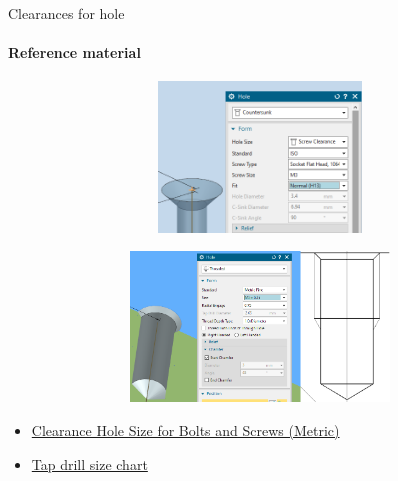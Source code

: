 \documentclass[aspectratio=169]{beamer}
\begin{document}
\begin{frame}[t]{Clearances for hole}
\framesubtitle{Reference material}
        \vspace{-0.4cm}
        \begin{figure}[H]
            \begin{subfigure}[t]{0.48\textwidth}
                \centering\includegraphics[height=4cm,width=1\textwidth,keepaspectratio]{nx_countersunk.png}
                \label{fig:nx_countersunk.png}
            \end{subfigure}
            \begin{subfigure}[t]{0.48\textwidth}
                \centering\includegraphics[height=4cm,width=1\textwidth,keepaspectratio]{nx_thread.png}
                \label{fig:nx_thread.png}
            \end{subfigure}
        \end{figure}
        \vspace{-0.7cm}

        \begin{itemize}
            \item \href{https://engineersbible.com/clearance-hole-metric/}{Clearance Hole Size for Bolts and Screws (Metric)}
            \item \href{https://www.machiningdoctor.com/charts/metric-thread-charts/}{Tap drill size chart}
        \end{itemize}
\end{frame}
\end{document}
